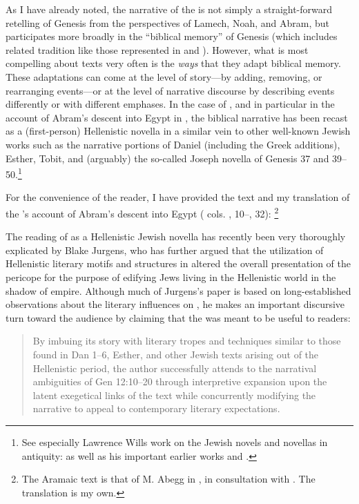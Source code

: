 As I have already noted, the narrative of the \ga is not simply a straight-forward retelling of Genesis from the perspectives of Lamech, Noah, and Abram, but participates more broadly in the ``biblical memory'' of Genesis (which includes related tradition like those represented in \firstenoch and \jub). However, what is most compelling about \rwb texts very often is the \emph{ways} that they adapt biblical memory. These adaptations can come at the level of story---by adding, removing, or rearranging events---or at the level of narrative discourse by describing events differently or with different emphases. In the case of \ga, and in particular in the account of Abram's descent into Egypt in , the biblical narrative has been recast as a (first-person) Hellenistic novella in a similar vein to other well-known \secondtemple Jewish works such as the narrative portions of Daniel (including the Greek additions), Esther, Tobit, and (arguably) the so-called Joseph novella of Genesis 37 and 39--50.\footnote{See especially Lawrence Wills work on the Jewish novels and novellas in antiquity: \cite*{wills2002} as well as his important earlier works \cite*{wills1995} and \cite{wills1990}.}

For the convenience of the reader, I have provided the text and my translation of the \ga's account of Abram's descent into Egypt ( cols. , 10--, 32):%
    \footnote{The Aramaic text is that of M. Abegg in \cite[1:534--537]{perry-tov2014}, in consultation with \cite{fitzmyer2004}. The translation is my own.}





The reading of \ga {} as a Hellenistic Jewish novella has recently been very thoroughly explicated by Blake Jurgens, who has further argued that the utilization of Hellenistic literary motifs and structures in \ga altered the overall presentation of the pericope for the purpose of edifying Jews living in the Hellenistic world in the shadow of empire.\autocite{jurgens_jsj2018} Although much of Jurgens's paper is based on long-established observations about the literary influences on \ga, he makes an important discursive turn toward the audience by claiming that the \ga was meant to be useful to readers:

\begin{quote}
By imbuing its story with literary tropes and techniques similar to those found in Dan 1--6, Esther, and other Jewish texts arising out of the Hellenistic period, the author successfully attends to the narratival ambiguities of Gen 12:10--20 through interpretive expansion upon the latent exegetical links of the text while concurrently modifying the narrative to appeal to contemporary literary expectations.\autocite[27]{jurgens_jsj2018} \end{quote}

